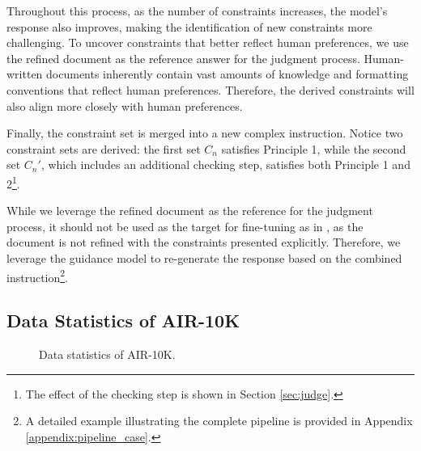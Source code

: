 Throughout this process, as the number of constraints increases, the model's response also improves, making the identification of new constraints more challenging. To uncover constraints that better reflect human preferences, we use the refined document as the reference answer for the judgment process. Human-written documents inherently contain vast amounts of knowledge and formatting conventions that reflect human preferences. Therefore, the derived constraints will also align more closely with human preferences.

Finally, the constraint set is merged into a new complex instruction. Notice two constraint sets are derived: the first set $C_n$ satisfies Principle 1, while the second set $C_n'$, which includes an additional checking step, satisfies both Principle 1 and 2\footnote{The effect of the checking step is shown in Section \ref{sec:judge}.}.

While we leverage the refined document as the reference for the judgment process, it should not be used as the target for fine-tuning as in \citet{nguyen2024better}, as the document is not refined with the constraints presented explicitly. Therefore, we leverage the guidance model to re-generate the response based on the combined instruction\footnote{A detailed example illustrating the complete pipeline is provided in Appendix \ref{appendix:pipeline_case}.}.


\subsection{Data Statistics of AIR-10K}

\begin{figure}[t]
\centering
{}
\vspace{-2mm}
\caption{Data statistics of AIR-10K. }
\vspace{-5mm}
\label{figure:constraint_and_domain}
\end{figure}

